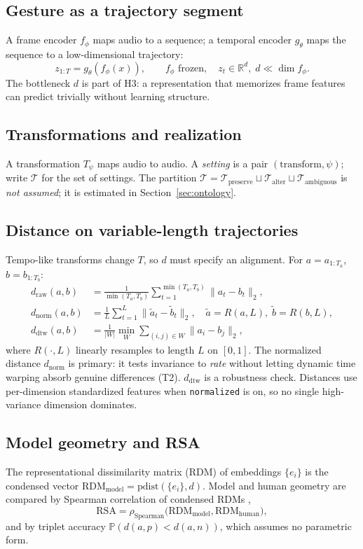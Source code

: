\documentclass[11pt]{article}
\newcommand{\R}{\mathbb{R}}
\newcommand{\cT}{\mathcal{T}}
\begin{document}
\subsection{Gesture as a trajectory segment}
A frame encoder $f_\phi$ maps audio to a sequence; a temporal encoder $g_\theta$
maps the sequence to a low-dimensional trajectory:
\begin{equation}
z_{1:T} = g_\theta\!\left(f_\phi(x)\right), \qquad f_\phi \text{ frozen}, \quad z_t \in \R^d, \; d \ll \dim f_\phi .
\end{equation}
The bottleneck $d$ is part of H3: a representation that memorizes frame features
can predict trivially without learning structure.

\subsection{Transformations and realization}
A transformation $T_\psi$ maps audio to audio. A \emph{setting} is a pair
$(\text{transform},\psi)$; write $\cT$ for the set of settings. The partition
$\cT=\cT_{\text{preserve}}\sqcup\cT_{\text{alter}}\sqcup\cT_{\text{ambiguous}}$ is
\emph{not assumed}; it is estimated in Section~\ref{sec:ontology}.

\subsection{Distance on variable-length trajectories}
Tempo-like transforms change $T$, so $d$ must specify an alignment. For
$a=a_{1:T_a}$, $b=b_{1:T_b}$:
\begin{align}
d_{\text{raw}}(a,b) &= \frac{1}{\min(T_a,T_b)}\sum_{t=1}^{\min(T_a,T_b)}\lVert a_t-b_t\rVert_2, \\
d_{\text{norm}}(a,b) &= \frac{1}{L}\sum_{t=1}^{L}\lVert \tilde a_t-\tilde b_t\rVert_2,
\quad \tilde a=R(a,L),\; \tilde b=R(b,L), \\
d_{\text{dtw}}(a,b) &= \frac{1}{|W|}\min_{W}\sum_{(i,j)\in W}\lVert a_i-b_j\rVert_2 ,
\end{align}
where $R(\cdot,L)$ linearly resamples to length $L$ on $[0,1]$. The normalized
distance $d_{\text{norm}}$ is primary: it tests invariance to \emph{rate} without
letting dynamic time warping absorb genuine differences (T2). $d_{\text{dtw}}$
\citep{sakoe1978dtw} is a robustness check. Distances use per-dimension
standardized features when \texttt{normalized} is on, so no single high-variance
dimension dominates.

\subsection{Model geometry and RSA}
The representational dissimilarity matrix (RDM) of embeddings $\{e_i\}$ is the
condensed vector $\mathrm{RDM}_{\text{model}}=\mathrm{pdist}(\{e_i\},d)$. Model
and human geometry are compared by Spearman correlation of condensed RDMs
\citep{kriegeskorte2008rsa},
\begin{equation}
\mathrm{RSA} = \rho_{\text{Spearman}}\big(\mathrm{RDM}_{\text{model}},\mathrm{RDM}_{\text{human}}\big),
\end{equation}
and by triplet accuracy $\mathbb{P}(d(a,p)<d(a,n))$, which assumes no parametric
form.
\end{document}
